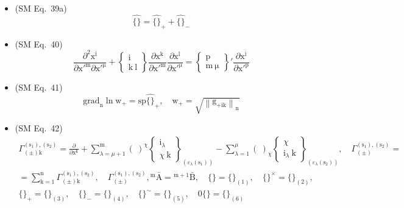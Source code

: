 \documentclass[
    12pt,              %
    a4paper,           %
    headings=normal,   %
    twoside=true,      %
    BCOR=8mm,          %
]{scrbook}
\begin{document}
\begin{itemize}[label={},leftmargin=0pt]
    \item (SM Eq.\ 39a) 
    \[
    \widehat{\{\}} = \widehat{\{\}}_+ + \widehat{\{\}}_-
    \]

    \item (SM Eq.\ 40) 
    \[
    \frac{\partial^2 \mathrm{x^i}}{\partial \mathrm{x'^m} \partial \mathrm{x'^\mu}} + \left\{ \begin{smallmatrix} \mathrm{i} \\ \mathrm{k\ l} \end{smallmatrix} \right\} \frac{\partial \mathrm{x^k}}{\partial \mathrm{x'^m}} \frac{\partial \mathrm{x^l}}{\partial \mathrm{x'^\mu}} = \left\{ \begin{smallmatrix} \mathrm{p} \\ \mathrm{m\ \mu} \end{smallmatrix} \right\}' \frac{\partial \mathrm{x^i}}{\partial \mathrm{x'^p}}
    \]

    \item (SM Eq.\ 41) 
    \[
    \mathrm{grad}_\mathrm{n} \ln \mathrm{w}_+ = \mathrm{sp} \widehat{\{\}}_+, \quad \mathrm{w}_+ = \sqrt{\left\| \mathrm{g}_{+\mathrm{ik}} \right\|_\mathrm{n}}
    \]

    \item (SM Eq.\ 42) 
    \[
    \begin{gathered}
    \Gamma^{(\mathrm{s}_1), (\mathrm{s}_2)}_{(\pm)\mathrm{k}} = \frac{\partial}{\partial \mathrm{x^k}} + \sum_{\lambda=\mu+1}^{\mathrm{m}} (\ )^\chi \left\{ \begin{smallmatrix} \mathrm{i}_\lambda \\ \chi\ \mathrm{k} \end{smallmatrix} \right\}_{(\varepsilon_\lambda(\mathrm{s}_1))} - \sum_{\lambda=1}^{\mu} (\ )_\chi \left\{ \begin{smallmatrix} \chi \\ \mathrm{i}_\lambda\ \mathrm{k} \end{smallmatrix} \right\}_{(\varepsilon_\lambda(\mathrm{s}_2))}, \quad \Gamma^{(\mathrm{s}_1), (\mathrm{s}_2)}_{(\pm)} = \\
    = \sum_{\mathrm{k}=1}^\mathrm{n} \Gamma^{(\mathrm{s}_1), (\mathrm{s}_2)}_{(\pm)\mathrm{k}}, \quad \Gamma^{(\mathrm{s}_1), (\mathrm{s}_2)}_{(\pm)}, {}^\mathrm{m}\bar{\mathrm{A}} = {}^{\mathrm{m}+1}\bar{\mathrm{B}}, \quad \{ \} = \{ \}_{(1)}, \quad \{ \}^\times = \{ \}_{(2)}, \\
    \{ \}_+ = \{ \}_{(3)}, \quad \{ \}_- = \{ \}_{(4)}, \quad \{ \}^\sim = \{ \}_{(5)}, \quad 0\{ \} = \{ \}_{(6)}
    \end{gathered}
    \]


\end{itemize}
\end{document}
